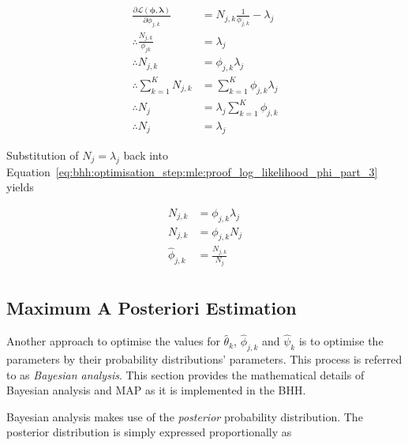 \begin{equation}
      \label{eq:bhh:optimisation_step:mle:proof_log_likelihood_phi_part_3}
      \begin{split}
            \frac{\partial \mathcal{L}(\boldsymbol{\phi}, \boldsymbol{\lambda})}{\partial \phi_{j,k}} &= N_{j,k} \frac{1}{\phi_{j,k}}  - \lambda_{j} \\
            \therefore \frac{N_{j,k}}{\phi_{jk}} &= \lambda_{j} \\
            \therefore N_{j,k} &= \phi_{j,k} \lambda_{j} \\
            \therefore \sum_{k=1}^{K} N_{j,k} &= \sum_{k=1}^{K} \phi_{j,k} \lambda_{j} \\
            \therefore N_{j} &= \lambda_{j} \sum_{k=1}^{K} \phi_{j,k} \\
            \therefore N_{j} &= \lambda_{j}
      \end{split}
\end{equation}

Substitution of $N_{j} = \lambda_{j}$ back into Equation~\eqref{eq:bhh:optimisation_step:mle:proof_log_likelihood_phi_part_3} yields

\begin{equation}
      \label{eq:bhh:optimisation_step:mle:proof_log_likelihood_phi_part_4}
      \begin{split}
            N_{j,k} &= \phi_{j,k} \lambda_{j} \\
            N_{j,k} &= \phi_{j,k} N_{j} \\
            \hat{\phi}_{j,k} &= \frac{N_{j,k}}{N_{j}}\\
      \end{split}
\end{equation}

\subsection{Maximum A Posteriori Estimation}\label{sec:bhh:optimisation_step:map}

Another approach to optimise the values for $\hat{\theta}_{k}$, $\hat{\phi}_{j,k}$ and $\hat{\psi}_{k}$ is to optimise the parameters by their probability distributions' parameters. This process is referred to as \textit{Bayesian analysis}. This section provides the mathematical details of Bayesian analysis and \acf{MAP} as it is implemented in the \acs{BHH}.

Bayesian analysis makes use of the \textit{posterior} probability distribution. The posterior distribution is simply expressed proportionally as

